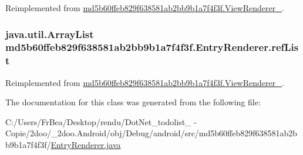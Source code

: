 Reimplemented from \hyperlink{classmd5b60ffeb829f638581ab2bb9b1a7f4f3f_1_1_view_renderer__2_80b609e3e4054c380887d4dc2907a875}{md5b60ffeb829f638581ab2bb9b1a7f4f3f.ViewRenderer\_}.\hypertarget{classmd5b60ffeb829f638581ab2bb9b1a7f4f3f_1_1_entry_renderer_58f9f17859b75ef1547191607bb86aaa}{
\subsubsection[{refList}]{\setlength{\rightskip}{0pt plus 5cm}java.util.ArrayList {\bf md5b60ffeb829f638581ab2bb9b1a7f4f3f.EntryRenderer.refList}}}
\label{classmd5b60ffeb829f638581ab2bb9b1a7f4f3f_1_1_entry_renderer_58f9f17859b75ef1547191607bb86aaa}




Reimplemented from \hyperlink{classmd5b60ffeb829f638581ab2bb9b1a7f4f3f_1_1_view_renderer__2_6c151401977148a92c515e9c7de1aaf8}{md5b60ffeb829f638581ab2bb9b1a7f4f3f.ViewRenderer\_}.

The documentation for this class was generated from the following file:\begin{CompactItemize}
\item 
C:/Users/FrBea/Desktop/rendu/DotNet\_\-todolist\_ - Copie/2doo/\_\-2doo.Android/obj/Debug/android/src/md5b60ffeb829f638581ab2bb9b1a7f4f3f/\hyperlink{_entry_renderer_8java}{EntryRenderer.java}\end{CompactItemize}
